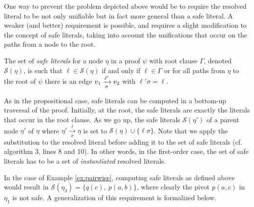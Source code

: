 One way to prevent the problem depicted above would be to require the resolved literal to be not only unifiable but in fact more general than a safe literal. A weaker (and better) requirement is possible, and requires a slight modification to the concept of safe literals, taking into account the unifications that occur on the paths from a node to the root. 


\begin{definition}
The set of \emph{safe literals} for a node $\eta$ in a proof $\psi$ with root clause $\Gamma$, denoted $\mathcal{S}(\eta)$, is such that $\ell \in \mathcal{S}(\eta)$ if and only if $\ell \in \Gamma$ or for all paths from $\eta$ to the root of $\psi$ there is an edge $v_1
\xrightarrow[\sigma]{\ell'} v_2$ with $\ell' \sigma = \ell$.
\end{definition}

As in the propositional case, safe literals can be computed in a bottom-up traversal of the proof. Initially, at the root, the safe literals are exactly the literals that occur in the root clause. As we go up, the safe literals $\mathcal{S}(\eta')$ of a parent node $\eta'$ of $\eta$ where $\eta'
\xrightarrow[\sigma]{\ell} \eta$ is set to $\mathcal{S}(\eta) \cup \{ \ell \sigma \}$. Note that we apply the substitution to the resolved literal before adding it to the set of safe literals (cf. algorithm 3, lines 8 and 10). In other words, in the first-order case, the set of safe literals has to be a set of \emph{instantiated} resolved literals.

 In the case of Example \ref{ex:pairwise}, computing safe literals as defined above would result in $\mathcal{S}(\eta_3)=\{q(c),~p(a,b)\}$, where clearly the pivot $p(a,c)$ in $\eta_1$ is not safe. A generalization of this requirement is formalized below.



